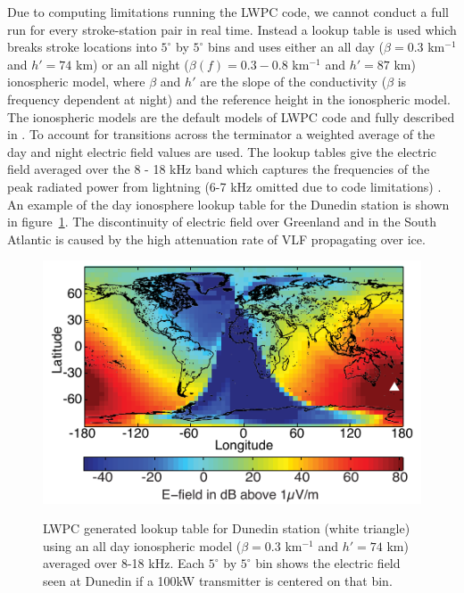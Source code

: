 Due to computing limitations running the LWPC code, we cannot conduct a full run for every stroke-station pair in real time.
Instead a lookup table is used which breaks stroke locations into $5^{\circ}$ by $5^{\circ}$ bins and uses either an all day ($\beta=0.3$ km$^{-1}$ and $h'=74$ km) or an all night ($\beta(f)=0.3-0.8$ km$^{-1}$ and $h'=87$ km) ionospheric model, where $\beta$ and $h'$ are the slope of the conductivity ($\beta$ is frequency dependent at night) and the reference height in the ionospheric model.
The ionospheric models are the default models of LWPC code and fully described in \citet{Ferguson1998}. 
To account for transitions across the terminator a weighted average of the day and night electric field values are used.
The lookup tables give the electric field averaged over the 8 - 18 kHz band which captures the frequencies of the peak radiated power from lightning (6-7 kHz omitted due to code limitations) \citep{Volland1995}.
An example of the day ionosphere lookup table for the Dunedin station is shown in figure~\ref{energy:fig:lookup}.
The discontinuity of electric field over Greenland and in the South Atlantic is caused by the high attenuation rate of VLF propagating over ice.

\begin{figure}[ht!]
\centering
\includegraphics[scale=1]{energy/Figures/PPS_Lookup.pdf}\\
\caption{LWPC generated lookup table for Dunedin station (white triangle) using an all day ionospheric model ($\beta=0.3$ km$^{-1}$ and $h'=74$ km) averaged over 8-18 kHz. Each $5^{\circ}$ by $5^{\circ}$ bin shows the electric field seen at Dunedin if a 100kW transmitter is centered on that bin.}
\label{energy:fig:lookup}
\end{figure}


